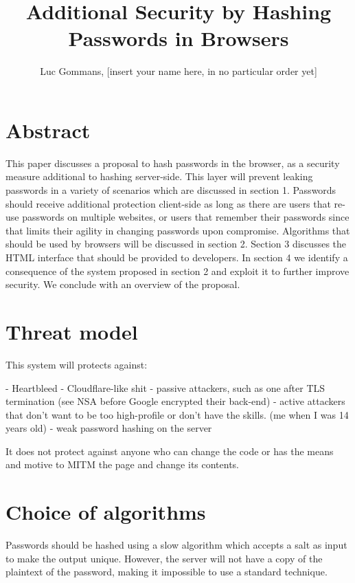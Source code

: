 \documentclass{paper}
\begin{document}
\title{Additional Security by Hashing Passwords in Browsers}
\author{Luc Gommans, [insert your name here, in no particular order yet]}

\begin{titlepage}
\maketitle
\end{titlepage}

\section*{Abstract}

This paper discusses a proposal to hash passwords in the browser, as a security measure
additional to hashing server-side. This layer will prevent leaking passwords in a variety of
scenarios which are discussed in section 1. Passwords should receive additional protection
client-side as long as there are users that re-use passwords on multiple websites, or users
that remember their passwords since that limits their agility in changing passwords upon
compromise. Algorithms that should be used by browsers will be discussed in section 2.
Section 3 discusses the HTML interface that should be provided to developers. In section 4 we
identify a consequence of the system proposed in section 2 and exploit it to further improve
security. We conclude with an overview of the proposal.

\section{Threat model}

This system will protects against:

- Heartbleed
- Cloudflare-like shit
- passive attackers, such as one after TLS termination (see NSA before Google encrypted their
back-end)
- active attackers that don't want to be too high-profile or don't have the skills. (me when
I was 14 years old)
- weak password hashing on the server

It does not protect against anyone who can change the code or has the means and motive to
MITM the page and change its contents.

\section{Choice of algorithms}

Passwords should be hashed using a slow algorithm which accepts a salt as input to make the
output unique. However, the server will not have a copy of the plaintext of the password,
making it impossible to use a standard technique.
\end{document}
